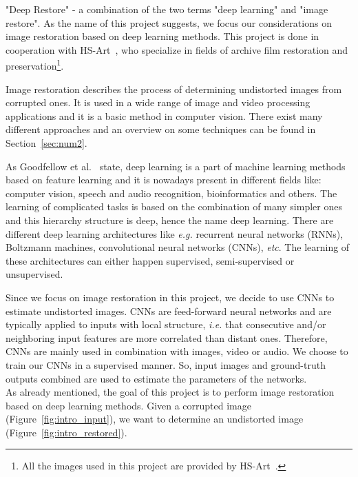 "Deep Restore" - a combination of the two terms "deep learning" and "image restore". As the name of this project suggests, we focus our considerations on image restoration based on deep learning methods. This project is done in cooperation with HS-Art~\cite{hs-art}, who specialize in fields of archive film restoration and preservation\footnote{All the images used in this project are provided by HS-Art~\cite{hs-art}.}.


Image restoration describes the process of determining undistorted images from corrupted ones. It is used in a wide range of image and video processing applications and it is a basic method in computer vision. There exist many different approaches and an overview on some techniques can be found in Section~\ref{sec:num2}.

As Goodfellow et al.~\cite{Goodfellow16} state, deep learning is a part of machine learning methods based on feature learning and it is nowadays present in different fields like: computer vision, speech and audio recognition, bioinformatics and others. The learning of complicated tasks is based on the combination of many simpler ones and this hierarchy structure is deep, hence the name deep learning. There are different deep learning architectures like \textit{e.g.} recurrent neural networks (RNNs), Boltzmann machines, convolutional neural networks (CNNs), \textit{etc}. The learning of these architectures can either happen supervised, semi-supervised or unsupervised.

Since we focus on image restoration in this project, we decide to use CNNs to estimate undistorted images.  CNNs are feed-forward neural networks and are typically applied to inputs with local structure, \textit{i.e.} that consecutive and/or neighboring input features are more correlated than distant ones. Therefore, CNNs are mainly used in combination with images, video or audio. We choose to train our CNNs in a supervised manner. So, input images and ground-truth outputs combined are used to estimate the parameters of the networks.\\

As already mentioned, the goal of this project is to perform image restoration based on deep learning methods. Given a corrupted image (Figure~\ref{fig:intro_input}), we want to determine an undistorted image (Figure~\ref{fig:intro_restored}). 

